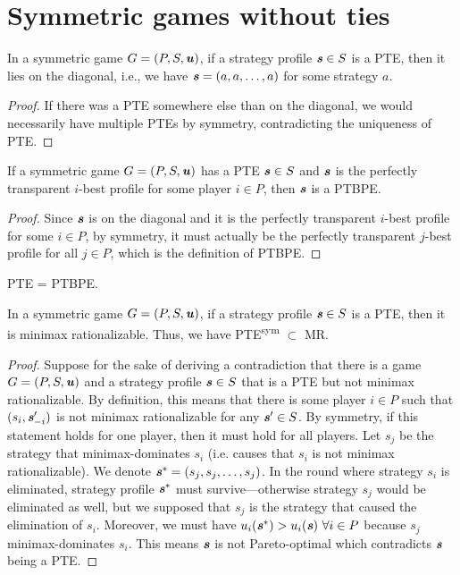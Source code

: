 \section{Symmetric games without ties}

\begin{observation}
	 In a symmetric game $G = (P, S, \boldsymbol{\mathit{u}})$, if a strategy profile $\boldsymbol{\mathit{s}} \in S$ is a PTE, then it lies on the diagonal, i.e., we have $\boldsymbol{\mathit{s}} = (a, a, \dots, a)$ for some strategy $a$.
\end{observation}

\begin{proof}
	If there was a PTE somewhere else than on the diagonal, we would necessarily have multiple PTEs by symmetry, contradicting the uniqueness of PTE.
\end{proof}

\begin{corollary}
	If a symmetric game $G = (P, S, \boldsymbol{\mathit{u}})$ has a PTE $\boldsymbol{\mathit{s}} \in S$ and $\boldsymbol{\mathit{s}}$ is the perfectly transparent $i$-best profile for some player $i \in P$, then $\boldsymbol{\mathit{s}}$ is a PTBPE. 
\end{corollary}

\begin{proof}
	Since $\boldsymbol{\mathit{s}}$ is on the diagonal and it is the perfectly transparent $i$-best profile for some $i \in P$, by symmetry, it must actually be the perfectly transparent $j$-best profile for all $j \in P$, which is the definition of PTBPE.
\end{proof}

\begin{conjecture}
	PTE = PTBPE.
\end{conjecture}

\begin{lemma}
	In a symmetric game $G = (P, S, \boldsymbol{\mathit{u}})$, if a strategy profile $\boldsymbol{\mathit{s}} \in S$ is a PTE, then it is minimax rationalizable.
	Thus, we have PTE\textsuperscript{sym} $\subset$ MR.
\end{lemma}

\begin{proof}
	Suppose for the sake of deriving a contradiction that there is a game $G = (P, S, \boldsymbol{\mathit{u}})$ and a strategy profile $\boldsymbol{\mathit{s}} \in S$ that is a PTE but not minimax rationalizable.
	By definition, this means that there is some player $i \in P$ such that $(s_i, \boldsymbol{\mathit{s}}_{-i}')$ is not minimax rationalizable for any $\boldsymbol{\mathit{s}}' \in S$.
	By symmetry, if this statement holds for one player, then it must hold for all players.
	Let $s_j$ be the strategy that minimax-dominates $s_i$ (i.e. causes that $s_i$ is not minimax rationalizable).
	We denote $\boldsymbol{\mathit{s}}^* = (s_j, s_j, \dots, s_j)$.
	In the round where strategy $s_i$ is eliminated, strategy profile $\boldsymbol{\mathit{s}}^*$ must survive---otherwise strategy $s_j$ would be eliminated as well, but we supposed that $s_j$ is the strategy that caused the elimination of $s_i$.
	Moreover, we must have $u_i(\boldsymbol{\mathit{s}}^*) > u_i(\boldsymbol{\mathit{s}})\ \forall i \in P$ because $s_j$ minimax-dominates $s_i$.
	This means $\boldsymbol{\mathit{s}}$ is not Pareto-optimal which contradicts $\boldsymbol{\mathit{s}}$ being a PTE.
\end{proof}
